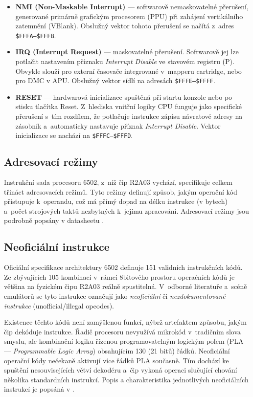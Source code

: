 \begin{itemize}
    \item \textbf{NMI (Non-Maskable Interrupt)} — softwarově nemaskovatelné přerušení, generované
        primárně grafickým procesorem (PPU) při zahájení vertikálního zatemnění (VBlank). Obslužný
        vektor tohoto přerušení se načítá z~adres \texttt{\$FFFA–\$FFFB}.
    \item \textbf{IRQ (Interrupt Request)} — maskovatelné přerušení. Softwarově jej lze potlačit
        nastavením příznaku \textit{Interrupt Disable} ve stavovém registru (P). Obvykle slouží pro
        externí časovače integrované v~mapperu cartridge, nebo pro DMC v APU. Obslužný vektor sídlí
        na adresách \texttt{\$FFFE–\$FFFF}.
    \item \textbf{RESET} — hardwarová inicializace spuštěná při startu konzole nebo po stisku
        tlačítka Reset. Z~hlediska vnitřní logiky CPU funguje jako specifické přerušení s~tím
        rozdílem, že potlačuje instrukce zápisu návratové adresy na zásobník a~automaticky nastavuje
        příznak \textit{Interrupt Disable}. Vektor inicializace se nachází na
        \texttt{\$FFFC–\$FFFD}.
\end{itemize}

\subsection{Adresovací režimy}

Instrukční sada procesoru 6502, z~níž čip R2A03 vychází, specifikuje celkem třináct adresovacích
režimů. Tyto režimy definují způsob, jakým operační kód přistupuje k~operandu, což má přímý dopad na
délku instrukce (v bytech) a~počet strojových taktů nezbytných k~jejímu zpracování. Adresovací
režimy jsou podrobně popsány v datasheetu \cite{6502-datasheet}.

\subsection{Neoficiální instrukce}

Oficiální specifikace architektury 6502 definuje 151 validních instrukčních kódů. Ze zbývajících 105
kombinací v~rámci 8bitového prostoru operačních kódů je většina na fyzickém čipu R2A03 reálně
spustitelná. V~odborné literatuře a~scéně emulátorů se tyto instrukce označují jako
\textit{neoficiální} či \textit{nezdokumentované instrukce} (unofficial/illegal opcodes).

Existence těchto kódů není zamýšlenou funkcí, nýbrž artefaktem způsobu, jakým čip dekóduje
instrukce. Řadič procesoru nevyužívá mikrokód v~tradičním slova smyslu, ale kombinační logiku
řízenou programovatelným logickým polem (PLA — \textit{Programmable Logic Array}) obsahujícím
130 (21 bitů) řádků. Neoficiální operační kódy nečekaně aktivují více řádků PLA
současně. Tím dochází ke spuštění nesouvisejících větví dekodéru a~čip vykoná operaci slučující
chování několika standardních instrukcí.\cite{pagetable-illegal-opcodes} Popis a charakteristika
jednotlivých neoficiálních instrukcí je popsáná v \cite{nmos6510-unintended-opcodes}.
